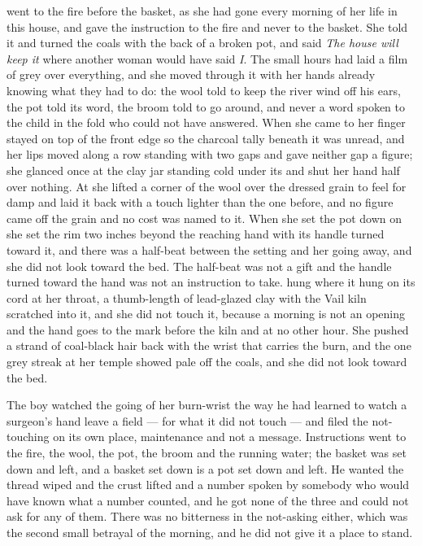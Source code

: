  went to the fire before the basket, as she had gone every morning of her life in this house, and gave the instruction to the fire and never to the basket. She told it  and turned the coals with the back of a broken pot, and said \emph{The house will keep it} where another woman would have said \emph{I}. The small hours had laid a film of grey over everything, and she moved through it with her hands already knowing what they had to do: the wool told to keep the river wind off his ears, the pot told its word, the broom told to go around, and never a word spoken to the child in the fold who could not have answered. When she came to  her finger stayed on top of the front edge so the charcoal tally beneath it was unread, and her lips moved along a row standing with two gaps and gave neither gap a figure; she glanced once at the clay jar standing cold under its  and shut her hand half over nothing. At  she lifted a corner of the wool over the dressed grain to feel for damp and laid it back with a touch lighter than the one before, and no figure came off the grain and no cost was named to it. When she set the pot down on  she set the rim two inches beyond the reaching hand with its handle turned toward it, and there was a half-beat between the setting and her going away, and she did not look toward the bed. The half-beat was not a gift and the handle turned toward the hand was not an instruction to take.  hung where it hung on its cord at her throat, a thumb-length of lead-glazed clay with the Vail kiln scratched into it, and she did not touch it, because a morning is not an opening and the hand goes to the mark before the kiln and at no other hour. She pushed a strand of coal-black hair back with the wrist that carries the burn, and the one grey streak at her temple showed pale off the coals, and she did not look toward the bed.

The boy watched the going of her burn-wrist the way he had learned to watch a surgeon's hand leave a field --- for what it did not touch --- and filed the not-touching on its own place, maintenance and not a message. Instructions went to the fire, the wool, the pot, the broom and the running water; the basket was set down and left, and a basket set down is a pot set down and left. He wanted the thread wiped and the crust lifted and a number spoken by somebody who would have known what a number counted, and he got none of the three and could not ask for any of them. There was no bitterness in the not-asking either, which was the second small betrayal of the morning, and he did not give it a place to stand.

